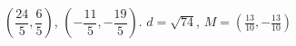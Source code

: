 {$\left( \dfrac{24}{5}, \dfrac{6}{5} \right)$, $\left( -\dfrac{11}{5}, -\dfrac{19}{5} \right)$.}
{$d = \sqrt{74}$, $M = \left(\frac{13}{10}, -\frac{13}{10} \right)$ }